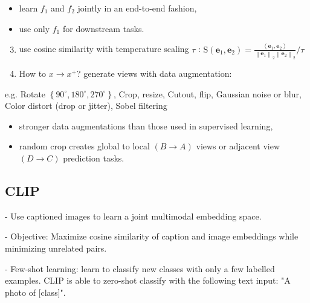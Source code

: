 \begin{itemize}
  \item learn $f_{1}$ and $f_{2}$ jointly in an end-to-end fashion,
  \item use only $f_{1}$ for downstream tasks.
\end{itemize}

\begin{enumerate}
  \setcounter{enumi}{2}
  \item use cosine similarity with temperature scaling $\tau$ :
  $
  \mathrm{S}\left(\mathbf{e}_{1}, \mathbf{e}_{2}\right)=\frac{\left\langle\mathbf{e}_{1}, \mathbf{e}_{2}\right\rangle}{\left\|\mathbf{e}_{1}\right\|_{2}\left\|\mathbf{e}_{2}\right\|_{2}} / \tau
  $
\end{enumerate}


\begin{enumerate}
  \setcounter{enumi}{3}
  \item How to $x \rightarrow x^+$? generate views with data augmentation:
\end{enumerate}


e.g. Rotate $\left\{90^{\circ}, 180^{\circ}, 270^{\circ}\right\}$, Crop, resize, Cutout, flip, Gaussian noise or blur, Color distort (drop or jitter), Sobel filtering

\begin{itemize}
  \item stronger data augmentations than those used in supervised learning,
  \item random crop creates global to local $(B \rightarrow A)$ views or adjacent view $(D \rightarrow C)$ prediction tasks.
\end{itemize}



\subsection*{CLIP}
- Use captioned images to learn a joint multimodal embedding space.

- Objective: Maximize cosine similarity of caption and image embeddings while minimizing unrelated pairs.

- Few-shot learning: learn to classify new classes with only a few labelled examples. CLIP is able to zero-shot classify with the following text input: "A photo of [class]".

